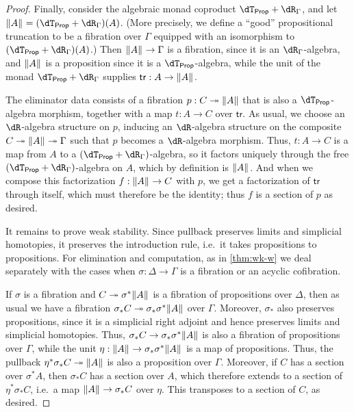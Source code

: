\documentclass{amsart}
\def\dtprop{\dT_{\mathsf{Prop}}}
\def\tr{\mathsf{tr}}
\begin{document}
\begin{proof}
  Finally, consider the algebraic monad coproduct $\dtprop + \dR_\Gamma$, and let $\brck A = (\dtprop+\dR_\Gamma)(A)$.
  (More precisely, we define a ``good'' propositional truncation to be a fibration over $\Gamma$ equipped with an isomorphism to $(\dtprop+\dR_\Gamma)(A)$.)
  Then $\mathopen{}\left\Vert A\right\Vert_{}\mathclose{} \to \Gamma$ is a fibration, since it is an $\dR_\Gamma$-algebra, and $\mathopen{}\left\Vert A\right\Vert_{}\mathclose{}$ is a proposition since it is a $\dtprop$-algebra, while the unit of the monad $\dtprop + \dR_\Gamma$ supplies $\tr:A\to\brck A$.

  The eliminator data consists of a fibration $p:C\twoheadrightarrow \mathopen{}\left\Vert A\right\Vert_{}\mathclose{}$ that is also a $\dtprop$-algebra morphism, together with a map $t:A\to C$ over $\tr$.
  As usual, we choose an $\dR$-algebra structure on $p$, inducing an $\dR$-algebra structure on the composite $C\twoheadrightarrow \mathopen{}\left\Vert A\right\Vert_{}\mathclose{} \twoheadrightarrow \Gamma$ such that $p$ becomes a $\dR$-algebra morphism.
  Thus, $t:A\to C$ is a map from $A$ to a $(\dtprop+\dR_\Gamma)$-algebra, so it factors uniquely through the free $(\dtprop+\dR_\Gamma)$-algebra on $A$, which by definition is $\mathopen{}\left\Vert A\right\Vert_{}\mathclose{}$.
  And when we compose this factorization $f:\mathopen{}\left\Vert A\right\Vert_{}\mathclose{} \to C$ with $p$, we get a factorization of $\tr$ through itself, which must therefore be the identity; thus $f$ is a section of $p$ as desired.

  It remains to prove weak stability.
  Since pullback preserves limits and simplicial homotopies, it preserves the introduction rule, i.e.\ it takes propositions to propositions.
  For elimination and computation, as in \cref{thm:wk-w} we deal separately with the cases when $\sigma:\Delta\to\Gamma$ is a fibration or an acyclic cofibration.

  If $\sigma$ is a fibration and $C\twoheadrightarrow \sigma^*\mathopen{}\left\Vert A\right\Vert_{}\mathclose{}$ is a fibration of propositions over $\Delta$, then as usual we have a fibration $\sigma_* C \twoheadrightarrow \sigma_* \sigma^* \mathopen{}\left\Vert A\right\Vert_{}\mathclose{}$ over $\Gamma$.
  Moreover, $\sigma_*$ also preserves propositions, since it is a simplicial right adjoint and hence preserves limits and simplicial homotopies.
  Thus, $\sigma_* C\to\sigma_*\sigma^*\mathopen{}\left\Vert A\right\Vert_{}\mathclose{}$ is also a fibration of propositions over $\Gamma$, while the unit $\eta : \mathopen{}\left\Vert A\right\Vert_{}\mathclose{} \to \sigma_* \sigma^* \mathopen{}\left\Vert A\right\Vert_{}\mathclose{}$ is a map of propositions.
  Thus, the pullback $\eta^* \sigma_* C \twoheadrightarrow \mathopen{}\left\Vert A\right\Vert_{}\mathclose{}$ is also a proposition over $\Gamma$.
  Moreover, if $C$ has a section over $\sigma^*A$, then $\sigma_* C$ has a section over $A$, which therefore extends to a section of $\eta^* \sigma_* C$, i.e.\ a map $\mathopen{}\left\Vert A\right\Vert_{}\mathclose{} \to \sigma_* C$ over $\eta$.
  This transposes to a section of $C$, as desired.


\end{proof}
\end{document}
